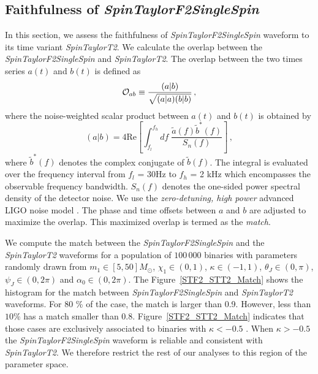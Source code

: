 \documentclass[preprint,onecolumn,,tightenlines,superscriptaddress,showpacs,nofootinbib,eqsecnum,amsfonts,amsmath]{revtex4}
\def\ECM#1{\textcolor{green}{ECM: #1}}
\def\ADAM#1{\textcolor{blue}{ADAM:#1}}
\begin{document}
\subsection{Faithfulness of {\it SpinTaylorF2SingleSpin}}
\label{IIc}

In this section, we assess the faithfulness of {\it SpinTaylorF2SingleSpin} waveform to its time variant {\it SpinTaylorT2}. We calculate the overlap between 
the {\it SpinTaylorF2SingleSpin} and {\it SpinTaylorT2}. The overlap between the two times series $a(t)$ and $b(t)$ is defined as
\begin{equation}\label{eq:overlap}
{{\cal{O}}_{ab}} \equiv \frac{(a | b)} {\sqrt{ (a | a) (b | b)}} \,,
\end{equation}
where the noise-weighted scalar product between $a(t)$ and $b(t)$ is obtained by
\begin{equation}\label{eq:inner}
(a | b) = 4 \mathrm{Re} \left[ \int_{f_l}^{f_h} df \; \frac{\tilde{a}(f) \tilde{b}^*(f)}{S_n(f)} \right] \,,
\end{equation}
where $\tilde{b}^*(f)$ denotes the complex conjugate of $\tilde{b}(f)$. The integral is evaluated over the frequency interval from $f_l$ = 30Hz to $f_h$ = 2 kHz which encompasses the observable 
frequency bandwidth. %
$S_n(f)$ denotes the one-sided power spectral density of the detector noise. We use the \textit{zero-detuning, 
high power} advanced LIGO noise model \cite{aLIGOSensitivity}. The phase and time offsets between $a$ and $b$ are adjusted to maximize the overlap. This maximized overlap is termed as the {\it match}.

We compute the match between the {\it SpinTaylorF2SingleSpin} and the {\it SpinTaylorT2} waveforms for a population of $100\,000$ binaries with parameters randomly drawn 
from $m_1 \in [5, 50] M_\odot$, $\chi_1 \in (0, 1)$, $\kappa \in (-1, 1)$, $\theta_J \in (0, \pi)$, $\psi_J \in (0, 2 \pi)$ and $\alpha_0 \in (0, 2 \pi)$. The Figure~\ref{STF2_STT2_Match} 
shows the histogram for the match between {\it SpinTaylorF2SingleSpin} and {\it SpinTaylorT2} waveforms. For 80 \% of the case, the match is larger than 0.9. However, less than $10 \%$ 
has a match smaller than $0.8$.  Figure~\ref{STF2_STT2_Match} indicates that those cases are exclusively associated to binaries with $\kappa<-0.5$ \cite{AS2014}. When $\kappa > -0.5$
the {\it SpinTaylorF2SingleSpin} waveform is reliable and consistent with {\it SpinTaylorT2}. We therefore restrict the rest of our analyses to this region of the parameter space.
\end{document}
